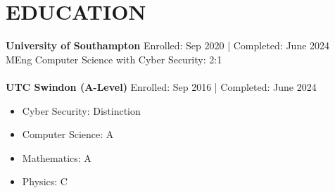 \section*{EDUCATION}
\noindent
\textbf{University of Southampton} \hfill Enrolled: Sep 2020 | Completed: June 2024\\ %
MEng Computer Science with Cyber Security: 2:1\\
\\
\textbf{UTC Swindon (A-Level)} \hfill Enrolled: Sep 2016 | Completed: June 2024
\begin{itemize}
    \item Cyber Security: Distinction
    \item Computer Science: A
    \item Mathematics: A
    \item Physics: C
\end{itemize}

